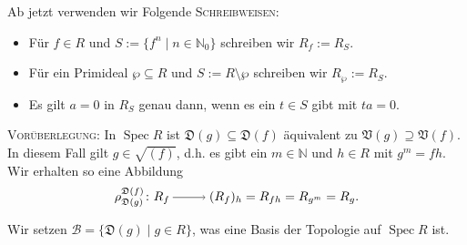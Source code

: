 \documentclass[a4paper,12pt,index=toc]{scrbook}
\theoremstyle{keinenummern} %
\def\V{\mathfrak{V}}
\newcommand{\D}{\mathfrak{D}}
\def\B{\mathcal{B}}
\newcommand{\Spec}{\operatorname{Spec}}
\newcommand{\set}[1]{\ensuremath{\mathbb{#1}}}
\newcommand{\N}{\set{N}}
\begin{document}
Ab jetzt verwenden wir Folgende \textsc{Schreibweisen}:
\begin{itemize}
\item Für $f\in R$ und $S:=\{f^n\mid n\in\N_0\}$ schreiben wir $R_f:=R_S$.
\item Für ein Primideal $\wp\subseteq R$ und $S:=R\setminus\wp$ schreiben wir $R_\wp:=R_S$.
\item Es gilt $a=0$ in $R_S$ genau dann, wenn es ein $t\in S$ gibt mit $ta=0$.
\end{itemize}

\textsc{Vorüberlegung}: In $\Spec R$ ist $\D(g)\subseteq \D(f)$ äquivalent zu $\V(g)\supseteq\V(f)$. In diesem Fall gilt
$g\in\sqrt{(f)}$, d.h. es gibt ein $m\in\N$ und $h\in R$ mit $g^m=fh$. Wir erhalten so eine Abbildung
\[ \rho_{\D(g)}^{\D(f)}\colon R_f\ra (R_f)_h=R_{fh}=R_{g^m}=R_g. \]

Wir setzen $\B=\{\D(g)\mid g\in R\}$, was eine Basis der Topologie auf $\Spec R$ ist.
\end{document}

